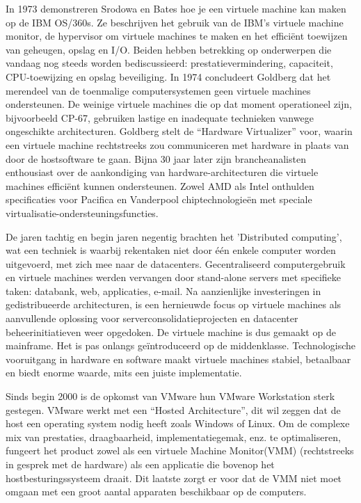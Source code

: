 In 1973 demonstreren Srodowa en Bates hoe je een virtuele machine kan maken op de IBM OS/360s. Ze beschrijven het gebruik van de IBM's virtuele machine monitor, de hypervisor om virtuele machines te maken en het efficiënt toewijzen van geheugen, opslag en I/O. Beiden hebben betrekking op onderwerpen die vandaag nog steeds worden bediscussieerd: prestatievermindering, capaciteit, CPU-toewijzing en opslag beveiliging. In 1974 concludeert Goldberg dat het merendeel van de toenmalige computersystemen geen virtuele machines ondersteunen. De weinige virtuele machines die op dat moment operationeel zijn, bijvoorbeeld CP-67, gebruiken lastige en inadequate technieken vanwege ongeschikte architecturen. Goldberg stelt de “Hardware Virtualizer” voor, waarin een virtuele machine rechtstreeks zou communiceren met hardware in plaats van door de hostsoftware te gaan. Bijna 30 jaar later zijn brancheanalisten enthousiast over de aankondiging van hardware-architecturen die virtuele machines efficiënt kunnen ondersteunen. Zowel AMD als Intel onthulden specificaties voor Pacifica en Vanderpool chiptechnologieën met speciale virtualisatie-ondersteuningsfuncties. \autocite{Radhwan2013}

De jaren tachtig en begin jaren negentig brachten het 'Distributed computing', wat een techniek is waarbij rekentaken niet door één enkele computer worden uitgevoerd,  met zich mee naar de datacenters. Gecentraliseerd computergebruik en virtuele machines werden vervangen door stand-alone servers met specifieke taken: databank, web, applicaties, e-mail. Na aanzienlijke investeringen in gedistribueerde architecturen, is een hernieuwde focus op virtuele machines als aanvullende oplossing voor serverconsolidatieprojecten en datacenter beheerinitiatieven weer opgedoken. De virtuele machine is dus gemaakt op de mainframe. Het is pas onlangs geïntroduceerd op de middenklasse. Technologische vooruitgang in hardware en software maakt virtuele machines stabiel, betaalbaar en biedt enorme waarde, mits een juiste implementatie. \autocite{Jeff2009}

Sinds begin 2000 is de opkomst van VMware hun VMware Workstation sterk gestegen. VMware werkt met een “Hosted Architecture”, dit wil zeggen dat de host een operating system nodig heeft zoals Windows of Linux. Om de complexe mix van prestaties, draagbaarheid, implementatiegemak, enz. te optimaliseren, fungeert het product zowel als een virtuele Machine Monitor(VMM) (rechtstreeks in gesprek met de hardware) als  een applicatie die bovenop het hostbesturingssysteem draait. Dit laatste zorgt er voor dat de VMM niet moet omgaan met een groot aantal apparaten beschikbaar op de computers. \autocite{Singh2004}

